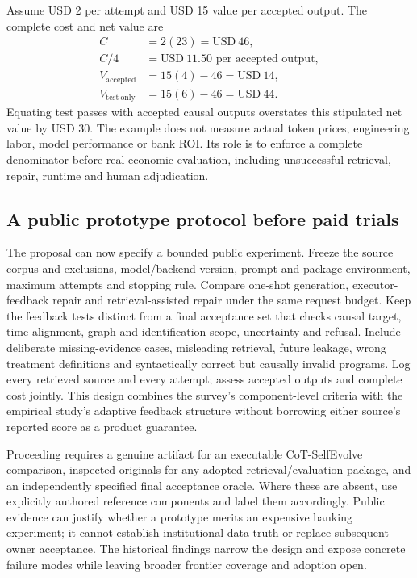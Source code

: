 Assume USD 2 per attempt and USD 15 value per accepted output. The complete
cost and net value are
\begin{align}
 C&=2(23)=\mathrm{USD}\ 46,\nonumber\\
 C/4&=\mathrm{USD}\ 11.50\text{ per accepted output},\nonumber\\
 V_{\mathrm{accepted}}&=15(4)-46=\mathrm{USD}\ 14,\nonumber\\
 V_{\mathrm{test\ only}}&=15(6)-46=\mathrm{USD}\ 44.
 \label{exec19:ragrepair-cost}
\end{align}
Equating test passes with accepted causal outputs overstates this stipulated
net value by USD 30. The example does not measure actual token prices,
engineering labor, model performance or bank ROI. Its role is to enforce a
complete denominator before real economic evaluation, including unsuccessful
retrieval, repair, runtime and human adjudication.
\citep{exec19_retrieval_repair_reference}

\subsection{A public prototype protocol before paid trials}
\label{exec19:ragrepair-protocol}
The proposal can now specify a bounded public experiment. Freeze the source
corpus and exclusions, model/backend version, prompt and package environment,
maximum attempts and stopping rule. Compare one-shot generation, executor-
feedback repair and retrieval-assisted repair under the same request budget.
Keep the feedback tests distinct from a final acceptance set that checks causal
target, time alignment, graph and identification scope, uncertainty and refusal.
Include deliberate missing-evidence cases, misleading retrieval, future leakage,
wrong treatment definitions and syntactically correct but causally invalid
programs. Log every retrieved source and every attempt; assess accepted outputs
and complete cost jointly. This design combines the survey's component-level
criteria with the empirical study's adaptive feedback structure without
borrowing either source's reported score as a product guarantee.
\citep{exec19_rag_survey,exec19_selfcorrection_study,exec19_retrieval_repair_reference}

Proceeding requires a genuine artifact for an executable CoT-SelfEvolve
comparison, inspected originals for any adopted retrieval/evaluation package,
and an independently specified final acceptance oracle. Where these are absent,
use explicitly authored reference components and label them accordingly.
Public evidence can justify whether a prototype merits an expensive banking
experiment; it cannot establish institutional data truth or replace subsequent
owner acceptance. The historical findings narrow the design and expose concrete
failure modes while leaving broader frontier coverage and adoption open.
\citep{exec19_rag_survey,exec19_selfcorrection_study}
